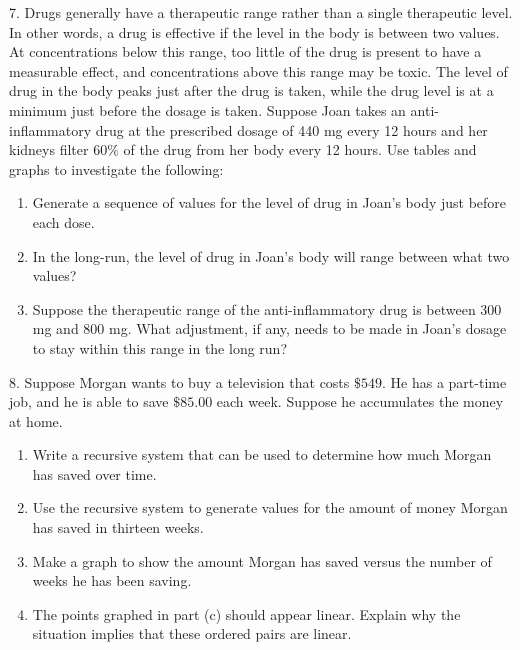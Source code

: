 \documentclass[10pt,]{book}
\theoremstyle{plain}
\theoremstyle{definition}
\theoremstyle{definition}
\theoremstyle{definition}
\numberwithin{equation}{section}
\begin{document}
\begin{exerciselist}
\begin{enumerate}[label=(\alph*)]
\end{enumerate}
%
\par\smallskip
\item[7.]\hypertarget{exercise-9}{}\hypertarget{p-27}{}%
Drugs generally have a therapeutic range rather than a single therapeutic level.  In other words, a drug is effective if the level in the body is between two values.  At concentrations below this range, too little of the drug is present to have a measurable effect, and concentrations above this range may be toxic.  The level of drug in the body peaks just after the drug is taken, while the drug level is at a minimum just before the dosage is taken.  Suppose Joan takes an anti-inflammatory drug at the prescribed dosage of 440 mg every 12 hours and her kidneys filter \(60\%\) of the drug from her body every 12 hours.  Use tables and graphs to investigate the following: \leavevmode%
\begin{enumerate}[label=(\alph*)]
\item\hypertarget{li-31}{}Generate a sequence of values for the level of drug in Joan’s body just before each dose.%
\item\hypertarget{li-32}{}In the long-run, the level of drug in Joan’s body will range  between what two values?%
\item\hypertarget{li-33}{}Suppose the therapeutic range of the anti-inflammatory drug is between 300 mg and 800 mg.  What adjustment, if any, needs to be made in Joan’s dosage to stay within this range in the long run?%
\end{enumerate}
%
\par\smallskip
\item[8.]\hypertarget{exercise-10}{}\hypertarget{p-28}{}%
Suppose Morgan  wants to buy a television that costs \(\$549\).  He has a part-time job, and he is able to save \(\$85.00\) each week.  Suppose he accumulates the money at home. \leavevmode%
\begin{enumerate}[label=(\alph*)]
\item\hypertarget{li-34}{}Write a recursive system that can be used to determine how much Morgan has saved over time.%
\item\hypertarget{li-35}{}Use the recursive system to generate values for the amount of money Morgan has saved in thirteen weeks.%
\item\hypertarget{li-36}{}Make a graph to show the amount Morgan has saved versus the number of weeks he has been saving.%
\item\hypertarget{li-37}{}The points graphed in part (c) should appear linear.  Explain why the situation implies that these ordered pairs are linear.%

\end{enumerate}
\end{exerciselist}
\end{document}
